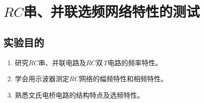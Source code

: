 \documentclass[UTF8]{article}
\begin{document}
    \section{$RC$串、并联选频网络特性的测试}
        \subsection{实验目的}
            \begin{enumerate}[label=\textbf{\arabic*}.]
                \item 研究$RC$串、并联电路及$RC$双\textit{T}电路的频率特性。
                \item 学会用示波器测定$RC$网络的幅频特性和相频特性。 
                \item 熟悉文氏电桥电路的结构特点及选频特性。
            \end{enumerate}
\end{document}
